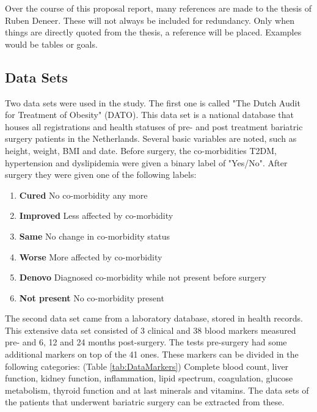 \documentclass[10pt,a4paper]{report}
\begin{document}
	Over the course of this proposal report, many references are made to the thesis of Ruben Deneer. These will not always be included for redundancy. Only when things are directly quoted from the thesis, a reference will be placed. Examples would be tables or goals.
	
	\subsection{Data Sets}
	\label{subsec:DataSets}
	
	Two data sets were used in the study. The first one is called "The Dutch Audit for Treatment of Obesity" (DATO). This data set is a national database that houses all registrations and health statuses of pre- and post treatment bariatric surgery patients in the Netherlands. Several basic variables are noted, such as height, weight, BMI and date. Before surgery, the co-morbidities T2DM, hypertension and dyslipidemia were given a binary label of "Yes/No". After surgery they were given one of the following labels:
	
	\begin{enumerate}
		\item \textbf{Cured} No co-morbidity any more		
		\item \textbf{Improved} Less affected by co-morbidity
		\item \textbf{Same} No change in co-morbidity status
		\item \textbf{Worse} More affected by co-morbidity
		\item \textbf{Denovo} Diagnosed co-morbidity while not present before surgery
		\item \textbf{Not present} No co-morbidity present				
	\end{enumerate}
	
	The second data set came from a laboratory database, stored in health records. This extensive data set consisted of 3 clinical and 38 blood markers measured pre- and 6, 12 and 24 months post-surgery. The tests pre-surgery had some additional markers on top of the 41 ones. These markers can be divided in the following categories: (Table \ref{tab:DataMarkers}) Complete blood count, liver function, kidney function, inflammation, lipid spectrum, coagulation, glucose metabolism, thyroid function and at last minerals and vitamins. The data sets of the patients that underwent bariatric surgery can be extracted from these. 
	
\end{document}
